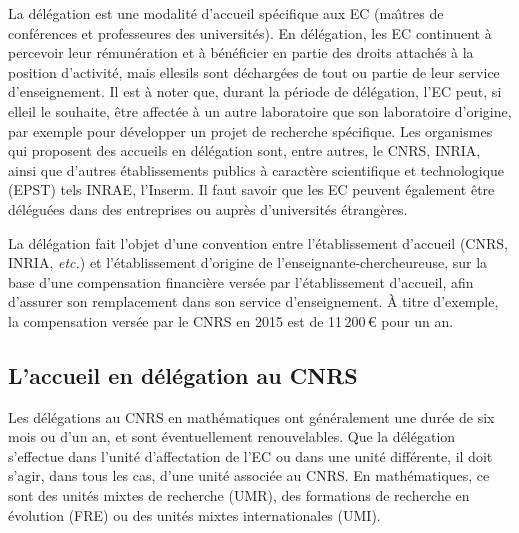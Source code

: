 La d\'el\'egation est une modalit\'e d'accueil sp\'ecifique aux
EC  (ma\^\i tres de conf\'erences et
professeur\mp e\mp s des universit\'es). En d\'el\'egation, les
EC continuent \`a percevoir leur r\'emun\'eration
et \`a b\'en\'eficier en partie des droits attach\'es \`a la position
d'activit\'e, mais elles\mp ils
sont d\'echarg\'e\mp e\mp s de tout ou partie de leur service d'enseignement.
Il est \`a noter que, durant la p\'eriode de d\'el\'egation, l'EC peut,
si elle\mp il le souhaite, \^etre affect\'e\mp e \`a un autre laboratoire
que son laboratoire d'origine, par exemple pour d\'evelopper
un projet de recherche sp\'ecifique.
Les organismes qui
proposent des accueils en d\'el\'egation sont, entre autres, le
CNRS, INRIA, ainsi que d'autres \'etablis\-se\-ments publics \`a
caract\`ere scientifique et technologique (EPST) tels INRAE,
l'Inserm. Il faut savoir que les EC peuvent
\'egalement \^etre d\'el\'egu\'e\mp e\mp s dans des entreprises ou aupr\`es
d'universit\'es \'etrang\`eres.

La d\'el\'egation fait l'objet d'une convention entre
l'\'etablissement d'accueil (CNRS, INRIA, {\em etc.}) et
l'\'etablisse\-ment d'origine de l'enseignant\mp e-chercheur\mp euse, sur la base
d'une compensation financi\`ere vers\'ee par l'\'etablissement
d'accueil, afin d'assurer son remplacement dans son service
d'enseignement. \`A titre d'exemple, la compensation vers\'ee par le
CNRS en 2015 est de 11\,200\,\euro{} pour un an.

\subsection*{L'accueil en d\'el\'egation au CNRS}


Les d\'el\'egations au CNRS en math\'ematiques ont g\'en\'eralement
une dur\'ee de six mois ou d'un an, et sont \'eventuellement
renouvelables. Que la d\'el\'egation s'effectue dans l'unit\'e
d'affectation de l'EC ou dans une unit\'e
diff\'erente, il doit s'agir, dans tous les cas, d'une unit\'e
associ\'ee au CNRS. En math\'ematiques, ce sont des unit\'es mixtes de
recherche (UMR), des formations de recherche en \'evolution (FRE)
ou des unit\'es mixtes internationales (UMI).

